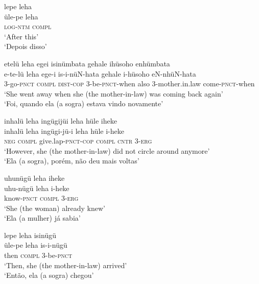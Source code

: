 \documentclass[output=paper,
modfonts,nonflat
]{langsci/langscibook}
\begin{document}
\ea lepe leha \\[.3em]
\gll üle-pe		leha \\
\textsc{log-ntm}	\textsc{compl} \\
\glt ‘After this’ \\
‘Depois disso’ \\
\z

\ea etelü leha egei isinümbata gehale ihüsoho enhümbata \\[.3em]
\gll e-te-lü		leha	ege-i		is-i-nüN-hata		gehale	i-hüsoho 	eN-nhüN-hata \\
3-go-\textsc{pnct} 	\textsc{compl}	\textsc{dist-cop}	3-be-\textsc{pnct}-when		also 3-mother.in.law	come-\textsc{pnct}-when \\
\glt ‘She went away when she (the mother-in-law) was coming back again’ \\
‘Foi, quando ela (a sogra) estava vindo novamente’ \\
\z

\newpage 
\ea inhalü leha ingügijüi leha hüle iheke \\[.3em]
\gll inhalü{\footnotemark}{}	leha	ingügi-jü-i		leha	hüle	i-heke \\
\textsc{neg}	\textsc{compl}	give.lap-\textsc{pnct-cop} 	\textsc{compl}	\textsc{cntr}	3-\textsc{erg} \\
\glt ‘However, she (the mother-in-law) did not circle around anymore’ \\
‘Ela (a sogra), porém, não deu mais voltas’ \\
\z

\ea uhunügü leha iheke \\[.3em]
\gll uhu-nügü	leha	i-heke \\
know-\textsc{pnct} 	\textsc{compl}	3-\textsc{erg} \\
\glt ‘She (the woman) already knew’ \\
‘Ela (a mulher) já sabia’ \\
\z

\ea lepe leha isinügü \\[.3em]
\gll üle-pe	leha	is-i-nügü \\
then	\textsc{compl}	3-be-\textsc{pnct} \\
\glt ‘Then, she (the mother-in-law) arrived’ \\
‘Então, ela (a sogra) chegou’ \\
\z
\end{document}
